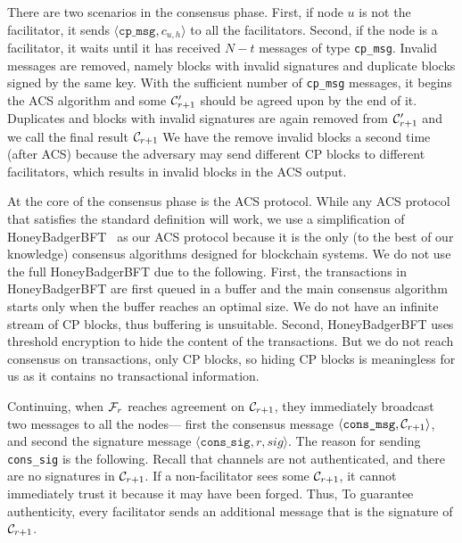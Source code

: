 There are two scenarios in the consensus phase.
First, if node $u$ is not the facilitator, it sends $\langle \texttt{cp\_msg}, c_{u, h} \rangle$ to all the facilitators.
Second, if the node is a facilitator, it waits until it has received $N - t$ messages of type \texttt{cp\_msg}.
Invalid messages are removed, namely blocks with invalid signatures and duplicate blocks signed by the same key.
With the sufficient number of \texttt{cp\_msg} messages,
it begins the ACS algorithm and some $\mathcal{C}'_{r + 1}$ should be agreed upon by the end of it.
Duplicates and blocks with invalid signatures are again removed from $\mathcal{C}'_{r+1}$ and we call the final result $\mathcal{C}_{r+1}$
We have the remove invalid blocks a second time (after ACS) because the adversary may send different CP blocks to different facilitators,
which results in invalid blocks in the ACS output.

At the core of the consensus phase is the ACS protocol.
While any ACS protocol that satisfies the standard definition will work,
we use a simplification of HoneyBadgerBFT~\cite{miller2016honey} as our ACS protocol
because it is the only (to the best of our knowledge) consensus algorithms designed for blockchain systems.
We do not use the full HoneyBadgerBFT due to the following.
First, the transactions in HoneyBadgerBFT are first queued in a buffer and the main consensus algorithm starts only when the buffer reaches an optimal size.
We do not have an infinite stream of CP blocks, thus buffering is unsuitable.
Second, HoneyBadgerBFT uses threshold encryption to hide the content of the transactions.
But we do not reach consensus on transactions, only CP blocks, so hiding CP blocks is meaningless for us as it contains no transactional information.

Continuing, when $\mathcal{F}_{r}$ reaches agreement on $\mathcal{C}_{r+1}$,
they immediately broadcast two messages to all the nodes---
first the consensus message $\langle \texttt{cons\_msg}, \mathcal{C}_{r+1} \rangle$,
and second the signature message $\langle \texttt{cons\_sig}, r, sig \rangle$.
The reason for sending \texttt{cons\_sig} is the following.
Recall that channels are not authenticated, 
and there are no signatures in $\mathcal{C}_{r + 1}$.
If a non-facilitator sees some $\mathcal{C}_{r + 1}$, it cannot immediately trust it because it may have been forged.
Thus, To guarantee authenticity, every facilitator sends an additional message that is the signature of $\mathcal{C}_{r + 1}$.

